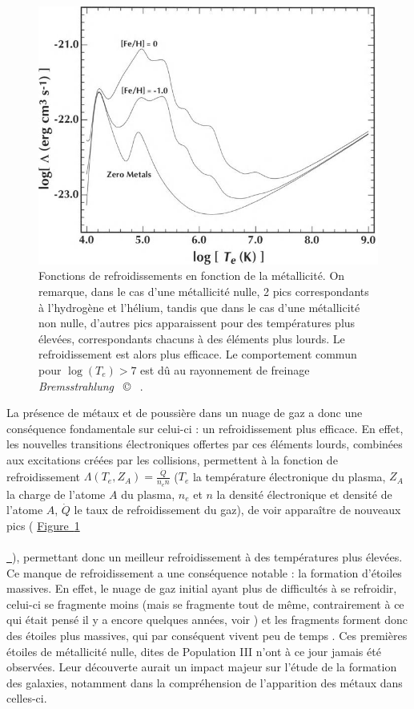 \documentclass[12pt, a4paper]{article}
\newcommand{\customcite}[1]{\mbox{
  {\small \copyright} \cite{#1}}
}
\newcommand*{\figref}[2][]{%
  \hyperref[{#2}]{%
    Figure~\ref*{#2}%
    \ifx\\#1\\%
    \else
      \,#1%
    \fi
  }%
}
\begin{document}
\begin{figure}[!h]
  \centering
  \includegraphics[scale=1.2]{assets/cooling.jpg}
  \caption{Fonctions de refroidissements en fonction de la métallicité. On remarque, dans le cas d'une métallicité nulle, 2 pics correspondants à l'hydrogène et l'hélium, tandis que dans le cas d'une métallicité non nulle, d'autres pics apparaissent pour des températures plus élevées, correspondants chacuns à des éléments plus lourds. Le refroidissement est alors plus efficace. Le comportement commun pour $\log(T_e) > 7$ est dû au rayonnement de freinage \textit{Bremsstrahlung} \customcite{Astrophysics-of-the-Diffuse-Universe}.}
  \label{fig:cooling}
\end{figure}

La présence de métaux et de poussière dans un nuage de gaz a donc une conséquence fondamentale sur celui-ci : un refroidissement plus efficace. En effet, les nouvelles transitions électroniques offertes par ces éléments lourds, combinées aux excitations créées par les collisions, permettent à la fonction de refroidissement $\Lambda(T_e,Z_A) = \frac{\dot{Q}}{n_e n}$ ($T_e$ la température électronique du plasma, $Z_A$ la charge de l'atome $A$ du plasma, $n_e$ et $n$ la densité électronique et densité de l'atome $A$, $\dot Q$ le taux de refroidissement du gaz), de voir apparaître de nouveaux pics (\figref{fig:cooling}), permettant donc un meilleur refroidissement à des températures plus élevées.\\

Ce manque de refroidissement a une conséquence notable : la formation d'étoiles massives. En effet, le nuage de gaz initial ayant plus de difficultés à se refroidir, celui-ci se fragmente moins (mais se fragmente tout de même, contrairement à ce qui était pensé il y a encore quelques années, voir \cite{Tan_2004}) et les fragments forment donc des étoiles plus massives, qui par conséquent vivent peu de temps \parencite{2023ARA&A..61...65K}. Ces premières étoiles de métallicité nulle, dites de Population III n'ont à ce jour jamais été observées. Leur découverte aurait un impact majeur sur l'étude de la formation des galaxies, notamment dans la compréhension de l'apparition des métaux dans celles-ci.
\end{document}
